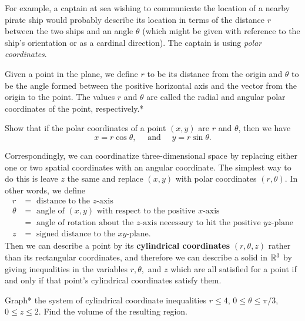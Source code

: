 \documentclass{watsonbook}
\begin{document}
For example, a captain at sea wishing to communicate the location of a
nearby pirate ship would probably describe its location in terms of
the distance $r$ between the two ships and an angle $\theta$ (which
might be given with reference to the ship's orientation or as a
cardinal direction). The captain is using \textit{polar coordinates}. 

Given a point in the plane, we define $r$ to be its distance from the
origin and $\theta$ to be the angle formed between the positive
horizontal axis and the vector from the
origin to the point. The values $r$ and $\theta$ are called the radial
and angular 
polar coordinates of the point, respectively.* 

\begin{exercise}{}{}
  Show that if the polar coordinates of a point $(x,y)$ are $r$ and
  $\theta$, then we have
  \[
    x = r\cos \theta, \quad \text { and } \quad y  = r\sin \theta. 
  \]
\end{exercise}

Correspondingly, we can coordinatize three-dimensional space by
replacing either one or two spatial coordinates with an angular
coordinate. The simplest way to do this is leave $z$ the same and
replace $(x,y)$ with polar coordinates $(r,\theta)$. In other words,
we define
\begin{align*}
  r &= \text{ distance to the }z\text{-axis} \\
  \theta &= \text{ angle of } (x,y) \text{ with respect to the positive
           }x\text{-axis} \\  &=
                                \text{ angle of rotation
                                about the }z\text{-axis necessary to hit the
                                positive }yz\text{-plane}  \\ 
  z &= \text{ signed distance to the }xy\text{-plane}. 
\end{align*}
Then we can describe a point by its \textbf{cylindrical coordinates}
$(r,\theta, z)$ rather than its rectangular coordinates, and therefore
we can describe a solid in $\mathbb{R}^3$ by giving inequalities in the
variables $r, \theta,$ and $z$ which are all satisfied for a point if
and only if that point's cylindrical coordinates satisfy
them. 

\begin{example}{}{}
  Graph* the system of cylindrical coordinate inequalities $r \leq 4$,
  $0 \leq \theta \leq \pi/3$, $0 \leq z \leq 2$. Find the volume of
  the resulting region. 
\end{example}
\end{document}
